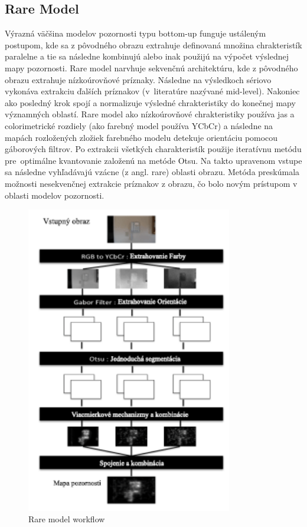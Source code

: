 \subsection{Rare Model}
Výrazná väčšina modelov pozornosti typu bottom-up funguje ustáleným postupom, kde sa z pôvodného obrazu extrahuje definovaná množina chrakteristík paralelne a tie sa následne kombinujú alebo inak použijú na výpočet výslednej mapy pozornosti.
Rare model narvhuje sekvenčnú architektúru, kde z pôvodného obrazu extrahuje nízkoúrovňové príznaky.
Následne na výsledkoch sériovo vykonáva extrakciu ďalších príznakov (v~literatúre nazývané mid-level).
Nakoniec ako posledný krok spojí a normalizuje výsledné chrakteristiky do konečnej mapy významných oblastí.
Rare model ako nízkoúrovňové chrakteristiky používa jas a colorimetrické rozdiely (ako farebný model používa YCbCr) a následne na mapách rozložených zložiek farebného modelu detekuje orientáciu pomocou gáborových filtrov\cite{rare-1}.
Po extrakcii všetkých charakteristík použije iteratívnu metódu pre~optimálne kvantovanie založenú na metóde Otsu\cite{otsu}.
Na takto upravenom vstupe sa následne vyhľadávajú vzácne (z angl. rare) oblasti obrazu.
Metóda preskúmala možnosti nesekvenčnej extrakcie príznakov z obrazu, čo bolo novým prístupom v oblasti modelov pozornosti.

\begin{figure}[H]
  \centering
  \includegraphics[width=9cm]{pics/rare-1.png}
  \caption{Rare model workflow\cite{rare-1}}\label{wrap-fig:3}
\end{figure}

